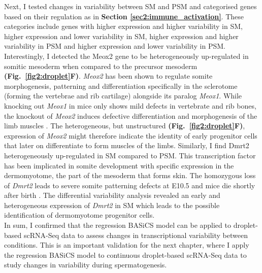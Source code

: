Next, I tested changes in variability between SM and PSM and categorised genes based on their regulation as in \textbf{Section \ref{sec2:immune_activation}}. 
These categories include genes with higher expression and higher variability in SM, higher expression and lower variability in SM, higher expression and higher variability in PSM and higher expression and lower variability in PSM. 
Interestingly, I detected the \gls{Meox2} gene to be heterogeneously up-regulated in somitic mesoderm when compared to the precursor mesoderm \textbf{(Fig.~\ref{fig2:droplet}F)}. 
\textit{Meox2} has been shown to regulate somite morphogenesis, patterning and differentiation specifically in the sclerotome (forming the vertebrae and rib cartilage) alongside its paralog \textit{Meox1}. 
While knocking out \textit{Meox1} in mice only shows mild defects in vertebrate and rib bones, the knockout of \textit{Meox2} induces defective differentiation and morphogenesis of the limb muscles \cite{Mankoo2003}. 
The heterogeneous, but unstructured \textbf{(Fig.~\ref{fig2:droplet}F)}, expression of \textit{Meox2} might therefore indicate the identity of early progenitor cells that later on differentiate to form  muscles of the limbs. 
Similarly, I find \gls{Dmrt2} heterogeneously up-regulated in SM compared to PSM. 
This transcription factor has been implicated in somite development with specific expression in the dermomyotome, the part of the mesoderm that forms skin. 
The homozygous loss of \textit{Dmrt2} leads to severe somite patterning defects at E10.5 and mice die shortly after birth \citep{Seo2006}. 
The differential variability analysis revealed an early and heterogeneous expression of \textit{Dmrt2} in SM which leads to the possible identification of dermomyotome progenitor cells.\\

In sum, I confirmed that the regression BASiCS model can be applied to droplet-based scRNA-Seq data to assess changes in transcriptional variability between conditions. 
This is an important validation for the next chapter, where I apply the regression BASiCS model to continuous droplet-based scRNA-Seq data to study changes in variability during spermatogenesis. 
